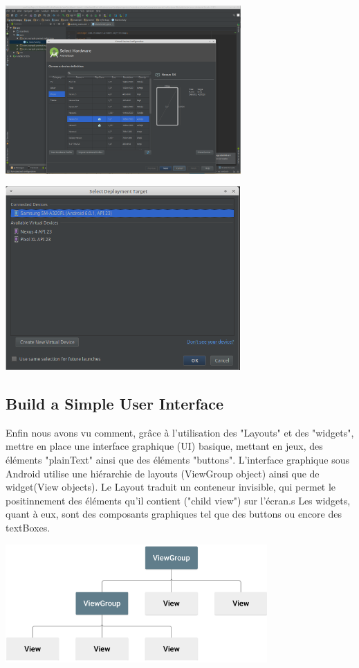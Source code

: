 \documentclass[french,a4paper,12pt]{report}
\begin{document}
\includegraphics[width=9cm]{7.png}

\includegraphics[width=9cm]{121.png}

\subsection{Build a Simple User Interface}

Enfin nous avons vu comment, grâce à l'utilisation des "Layouts" et des "widgets",
mettre en place une interface graphique (UI) basique, mettant en jeux, des éléments
"plainText" ainsi que des éléments "buttons".
\bigbreak
L'interface graphique sous Android utilise une hiérarchie de layouts (ViewGroup object)
ainsi que de widget(View objects).
\smallbreak
Le Layout traduit un conteneur invisible, qui permet le positinnement des éléments
qu'il contient ("child view") sur l'écran.s
\smallbreak
Les widgets, quant à eux, sont des composants graphiques tel que des buttons ou
encore des textBoxes.

\includegraphics[width=10cm]{13.png}
\end{document}
